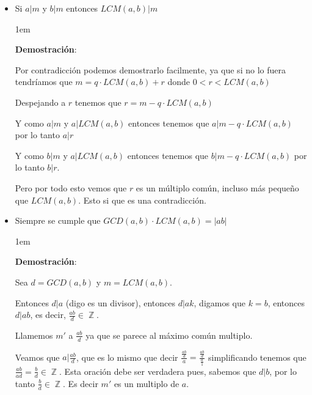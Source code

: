 \documentclass[12pt, fleqn]{report}                             %
\newenvironment{SmallIndentation}[1][0.75em]                    %
    {\begin{adjustwidth}{#1}{}\begin{footnotesize}}                 %
    {\end{footnotesize}\end{adjustwidth}}                           %
\DeclareMathOperator \Integers  {\mathbb{Z}}                     %
\begin{document}
            \begin{itemize}

                \item Si $a|m$ y $b|m$ entonces $LCM(a,b)|m$

                    \begin{SmallIndentation}[1em]
                        \textbf{Demostración}:

                        Por contradicción podemos demostrarlo facilmente, ya que
                        si no lo fuera tendríamos que $m = q \cdot LCM(a,b) + r$
                        donde $0<r<LCM(a,b)$

                        Despejando a $r$ tenemos que $r = m - q \cdot LCM(a,b)$
                        
                        Y como $a|m$ y $a|LCM(a,b)$ entonces tenemos que $a|m - q \cdot LCM(a,b)$
                        por lo tanto $a|r$

                        Y como $b|m$ y $a|LCM(a,b)$ entonces tenemos que $b|m - q \cdot LCM(a,b)$
                        por lo tanto $b|r$.

                        Pero por todo esto vemos que $r$ es un múltiplo común, incluso más 
                        pequeño que $LCM(a,b)$. Esto si que es una contradicción.    
                    \end{SmallIndentation}

                \item Siempre se cumple que $GCD(a,b) \cdot LCM(a,b) = |ab|$

                    \begin{SmallIndentation}[1em]
                        \textbf{Demostración}:

                        Sea $d = GCD(a,b)$ y $m = LCM(a,b)$.

                        Entonces $d|a$ (digo es un divisor), entonces $d|ak$, digamos que
                        $k=b$, entonces $d|ab$, es decir, $\frac{ab}{d} \in \Integers$.

                        Llamemos $m'$ a $\frac{ab}{d}$ ya que se parece al máximo común multiplo.

                        Veamos que $a|\frac{ab}{d}$, que es lo mismo que decir
                        $\frac{\frac{ab}{d}}{a} = \frac{\frac{ab}{d}}{\frac{a}{1}}$
                        simplificando tenemos que $\frac{ab}{ad} = \frac{b}{d} \in \Integers$.
                        Esta oración debe ser verdadera pues, sabemos que $d|b$,
                        por lo tanto $\frac{b}{d} \in \Integers$. Es decir $m'$ es un multiplo
                        de $a$.


\end{SmallIndentation}
\end{itemize}
\end{document}
